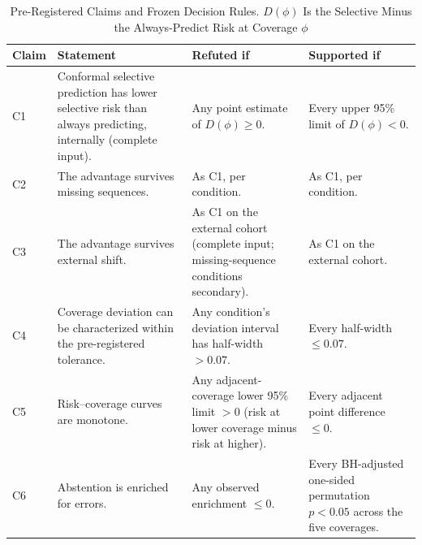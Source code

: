 \documentclass[journal]{IEEEtran}
\begin{document}
\begin{table}[t]
\centering
\caption{Pre-Registered Claims and Frozen Decision Rules. $D(\phi)$ Is the Selective Minus the Always-Predict Risk at Coverage $\phi$}
\label{tab:claimdefs}
\footnotesize
\begin{tabular}{p{0.8cm}p{5.4cm}p{4.6cm}p{4.6cm}}
\toprule
Claim & Statement & Refuted if & Supported if \\
\midrule
C1 & Conformal selective prediction has lower selective risk than always predicting, internally (complete input). & Any point estimate of $D(\phi)\ge0$. & Every upper 95\% limit of $D(\phi)<0$. \\
C2 & The advantage survives missing sequences. & As C1, per condition. & As C1, per condition. \\
C3 & The advantage survives external shift. & As C1 on the external cohort (complete input; missing-sequence conditions secondary). & As C1 on the external cohort. \\
C4 & Coverage deviation can be characterized within the pre-registered tolerance. & Any condition's deviation interval has half-width $>0.07$. & Every half-width $\le0.07$. \\
C5 & Risk--coverage curves are monotone. & Any adjacent-coverage lower 95\% limit $>0$ (risk at lower coverage minus risk at higher). & Every adjacent point difference $\le0$. \\
C6 & Abstention is enriched for errors. & Any observed enrichment $\le0$. & Every BH-adjusted one-sided permutation $p<0.05$ across the five coverages. \\
\bottomrule
\end{tabular}
\end{table}
\end{document}
